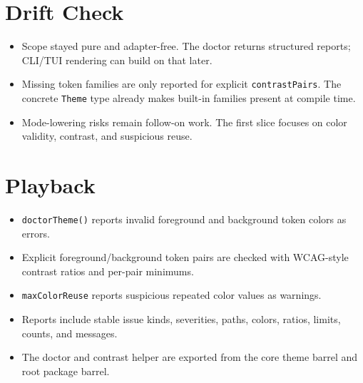 \section{Drift Check}\label{record-176-drift-check}

\begin{itemize}
\tightlist
\item
  Scope stayed pure and adapter-free. The doctor returns structured reports; CLI/TUI rendering can build on that later.
\item
  Missing token families are only reported for explicit \texttt{c\allowbreak{}o\allowbreak{}n\allowbreak{}t\allowbreak{}r\allowbreak{}a\allowbreak{}s\allowbreak{}t\allowbreak{}P\allowbreak{}a\allowbreak{}i\allowbreak{}r\allowbreak{}s}. The concrete \texttt{T\allowbreak{}h\allowbreak{}e\allowbreak{}m\allowbreak{}e} type already makes built-in families present at compile time.
\item
  Mode-lowering risks remain follow-on work. The first slice focuses on color validity, contrast, and suspicious reuse.
\end{itemize}

\section{Playback}\label{record-176-playback}

\begin{itemize}
\tightlist
\item
  \texttt{d\allowbreak{}o\allowbreak{}c\allowbreak{}t\allowbreak{}o\allowbreak{}r\allowbreak{}T\allowbreak{}h\allowbreak{}e\allowbreak{}m\allowbreak{}e\allowbreak{}(\allowbreak{})} reports invalid foreground and background token colors as errors.
\item
  Explicit foreground/background token pairs are checked with WCAG-style contrast ratios and per-pair minimums.
\item
  \texttt{m\allowbreak{}a\allowbreak{}x\allowbreak{}C\allowbreak{}o\allowbreak{}l\allowbreak{}o\allowbreak{}r\allowbreak{}R\allowbreak{}e\allowbreak{}u\allowbreak{}s\allowbreak{}e} reports suspicious repeated color values as warnings.
\item
  Reports include stable issue kinds, severities, paths, colors, ratios, limits, counts, and messages.
\item
  The doctor and contrast helper are exported from the core theme barrel and root package barrel.
\end{itemize}

